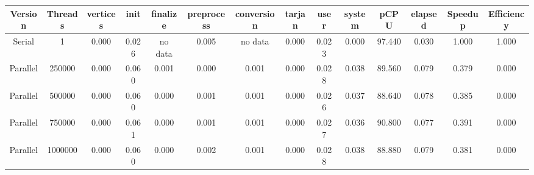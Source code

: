 \begin{tabular}{|c|c|c|c|c|c|c|c|c|c|c|c|c|c|}
\toprule
 Version &  Threads &    vertices &  init & finalize &  preprocess & conversion &  tarjan &  user &  system &   pCPU &  elapsed &  Speedup &  Efficiency \\
\midrule
  Serial &        1 &    0.000 & 0.026 &  no data &       0.005 &    no data &   0.000 & 0.023 &   0.000 & 97.440 &    0.030 &    1.000 &       1.000 \\
Parallel &   250000 &    0.000 & 0.060 &    0.001 &       0.000 &      0.001 &   0.000 & 0.028 &   0.038 & 89.560 &    0.079 &    0.379 &       0.000 \\
Parallel &   500000 &    0.000 & 0.060 &    0.000 &       0.001 &      0.001 &   0.000 & 0.026 &   0.037 & 88.640 &    0.078 &    0.385 &       0.000 \\
Parallel &   750000 &    0.000 & 0.061 &    0.000 &       0.001 &      0.001 &   0.000 & 0.027 &   0.036 & 90.800 &    0.077 &    0.391 &       0.000 \\
Parallel &  1000000 &    0.000 & 0.060 &    0.000 &       0.002 &      0.001 &   0.000 & 0.028 &   0.038 & 88.880 &    0.079 &    0.381 &       0.000 \\
\bottomrule
\end{tabular}
